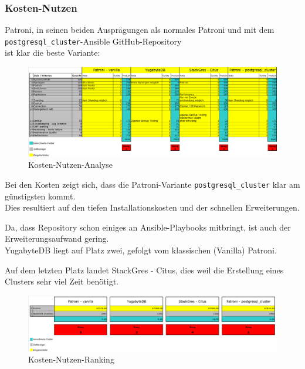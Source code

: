 
\begin{flushleft}
    \subsubsection{Kosten-Nutzen}
    Patroni, in seinen beiden Ausprägungen als normales Patroni und mit dem \texttt{postgresql\_cluster}-Ansible \Gls{GitHub}-Repository\\
    ist klar die beste Variante:
    \begin{figure}[H]
        \centering
        \includegraphics[width=1\linewidth]{source/implementation/evaluation/solution_comparison/nutzwert_analyse}
        \caption{Kosten-Nutzen-Analyse}
        \label{fig:nutzwert_analyse}
    \end{figure}
\end{flushleft}
\begin{flushleft}
    Bei den Kosten zeigt sich, dass die Patroni-Variante \texttt{postgresql\_cluster} klar am günstigsten kommt.\\
    Dies resultiert auf den tiefen Installationskosten und der schnellen Erweiterungen.
\end{flushleft}
\begin{flushleft}
    Da, dass Repository schon einiges an Ansible-Playbooks mitbringt, ist auch der Erweiterungsaufwand gering.\\
    YugabyteDB liegt auf Platz zwei, gefolgt vom klassischen (Vanilla) Patroni.
\end{flushleft}
\begin{flushleft}
    Auf dem letzten Platz landet StackGres - Citus, dies weil die Erstellung eines Clusters sehr viel Zeit benötigt.
    \begin{figure}[H]
        \centering
        \includegraphics[width=1\linewidth]{source/implementation/evaluation/solution_comparison/cost_benefit_ranking}
        \caption{Kosten-Nutzen-Ranking}
        \label{fig:cost_benefit_ranking}
    \end{figure}
\end{flushleft}
